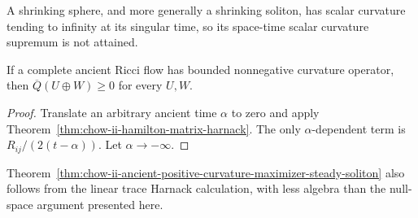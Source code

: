 \begin{remark}
\label{rem:chow-ii-shrinking-soliton-no-spacetime-r-maximum}
A shrinking sphere, and more generally a shrinking soliton, has scalar
curvature tending to infinity at its singular time, so its space-time scalar
curvature supremum is not attained.
\end{remark}

\begin{corollary}
\label{cor:chow-ii-ancient-matrix-harnack}
If a complete ancient Ricci flow has bounded nonnegative curvature operator,
then \(\overline Q(U\oplus W)\ge0\) for every \(U,W\).
\end{corollary}
\begin{proof}
Translate an arbitrary ancient time \(\alpha\) to zero and apply
Theorem~\ref{thm:chow-ii-hamilton-matrix-harnack}.  The only
\(\alpha\)-dependent term is \(R_{ij}/(2(t-\alpha))\).  Let
\(\alpha\to-\infty\).
\end{proof}

\begin{remark}
\label{rem:chow-ii-alternative-ancient-rigidity-proof}
Theorem~\ref{thm:chow-ii-ancient-positive-curvature-maximizer-steady-soliton}
also follows from the linear trace Harnack calculation, with less algebra than
the null-space argument presented here.
\end{remark}

